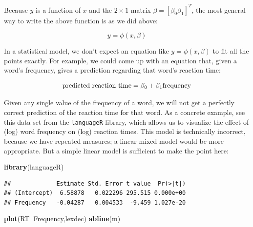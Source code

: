 \documentclass[12pt,]{krantz}
\newenvironment{Shaded}{\begin{snugshade}}{\end{snugshade}}
\newcommand{\KeywordTok}[1]{\textcolor[rgb]{0.13,0.29,0.53}{\textbf{#1}}}
\newcommand{\NormalTok}[1]{#1}
\newcommand{\OperatorTok}[1]{\textcolor[rgb]{0.81,0.36,0.00}{\textbf{#1}}}
\newcommand{\StringTok}[1]{\textcolor[rgb]{0.31,0.60,0.02}{#1}}
\begin{document}
Because \(y\) is a function of \(x\) and the \(2\times 1\) matrix \(\beta=[\beta_0 \beta_1]^T\), the most general way to write the above function is as we did above:

\begin{equation}
y = \phi(x,\beta)
\end{equation}

In a statistical model, we don't expect an equation like \(y=\phi(x,\beta)\) to fit all the points exactly. For example, we could come up with an
equation that, given a word's frequency, gives a prediction regarding that word's reaction time:

\begin{equation}
\hbox{predicted reaction time} = \beta_0 + \beta_1 \hbox{frequency}
\end{equation}

Given any single value of the frequency of a word, we will not get a perfectly correct prediction of the reaction time for that word. As a concrete example, see this data-set from the \texttt{languageR} library, which allows us to visualize the effect of (log) word frequency on (log) reaction times. This model is technically incorrect, because we have repeated measures; a linear mixed model would be more appropriate. But a simple linear model is sufficient to make the point here:

\begin{Shaded}
\begin{Highlighting}[]
\KeywordTok{library}\NormalTok{(languageR)}
\end{Highlighting}
\end{Shaded}

\begin{Shaded}
\end{Shaded}

\begin{verbatim}
##             Estimate Std. Error t value  Pr(>|t|)
## (Intercept)  6.58878   0.022296 295.515 0.000e+00
## Frequency   -0.04287   0.004533  -9.459 1.027e-20
\end{verbatim}

\begin{Shaded}
\begin{Highlighting}[]
\KeywordTok{plot}\NormalTok{(RT}\OperatorTok{~}\NormalTok{Frequency,lexdec)}
\KeywordTok{abline}\NormalTok{(m)}
\end{Highlighting}
\end{Shaded}
\end{document}
